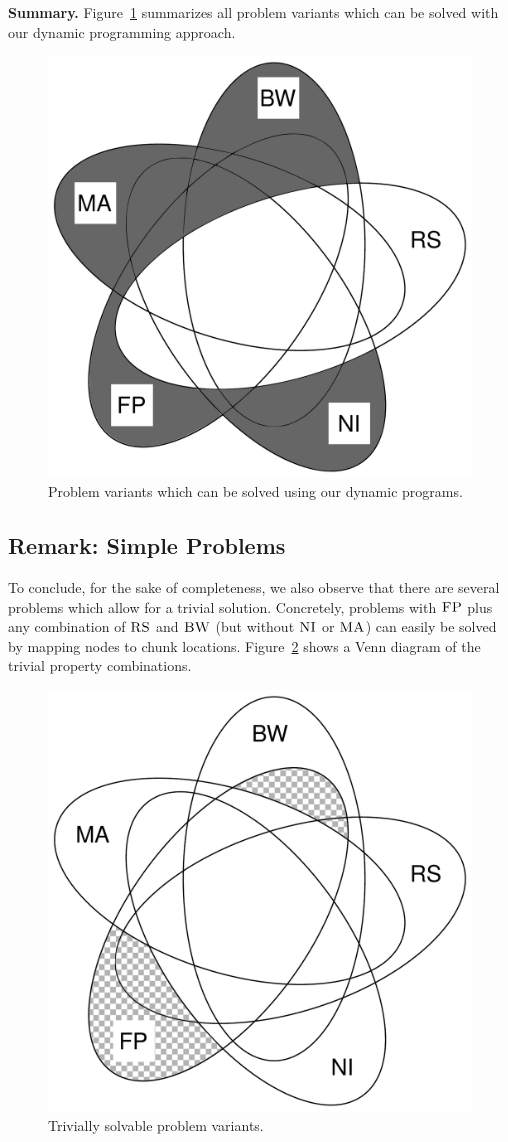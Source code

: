 \documentclass[9pt]{sigcomm-alternate}
\newcommand{\CC}{\textsc{NI}}
\newcommand{\FP}{\textsc{FP}}
\newcommand{\RS}{\textsc{RS}}
\newcommand{\BW}{\textsc{BW}}
\newcommand{\MA}{\textsc{MA}}
\begin{document}
\textbf{Summary.}
Figure~\ref{fig:venn_dp} summarizes all problem
variants which can be solved with our dynamic programming approach.
\begin{figure}
\includegraphics[width=0.48\columnwidth]{figs/venn_dp.pdf}
\caption{Problem variants which can be solved using our dynamic programs.}
\label{fig:venn_dp}
\end{figure}

\subsection{Remark: Simple Problems}

To conclude, for the sake of completeness, we also observe that there are
several problems which
allow for a trivial solution. Concretely, problems with $\FP$
plus any combination of
$\RS$ and $\BW$ (but without $\CC$ or $\MA$) can easily be solved by mapping nodes to chunk locations.
Figure~\ref{fig:venn_trivial}
shows a Venn diagram of the trivial property combinations.

\begin{figure}
\includegraphics[width=0.48\columnwidth]{figs/venn_trivial.pdf}
\caption{Trivially solvable problem variants.}
\label{fig:venn_trivial}
\end{figure}
\end{document}
